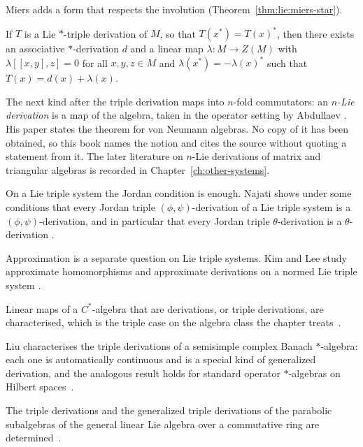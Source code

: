 Miers adds a form that respects the involution (Theorem~\ref{thm:lie:miers-star}).

\begin{theorem}\label{thm:lie:miers-star}
If $T$ is a Lie $*$-triple derivation of $M$, so that $T(x^{*})=T(x)^{*}$, then
there exists an associative $*$-derivation $d$ and a linear map
$\lambda\colon M\to Z(M)$ with $\lambda[[x,y],z]=0$ for all $x,y,z\in M$ and
$\lambda(x^{*})=-\lambda(x)^{*}$ such that $T(x)=d(x)+\lambda(x)$.
\end{theorem}

The next kind after the triple derivation maps into $n$-fold commutators:
an \emph{$n$-Lie derivation} is a map of the algebra, taken in the operator
setting by Abdullaev \cite{Abdullaev1992}.
His paper states the theorem for von Neumann algebras.
No copy of it has been obtained, so this book names the notion and cites the
source without quoting a statement from it.
The later literature on $n$-Lie derivations of matrix and triangular algebras
is recorded in Chapter~\ref{ch:other-systems}.

On a Lie triple system the Jordan condition is enough. Najati shows under some
conditions that every Jordan triple $(\phi,\psi)$-derivation of a Lie triple
system is a $(\phi,\psi)$-derivation, and in particular that every Jordan triple
$\theta$-derivation is a $\theta$-derivation
\cite[Abstract, p.~143]{Najati2009LieTripleSystems}.

Approximation is a separate question on Lie triple systems. Kim and Lee study
approximate homomorphisms and approximate derivations on a normed Lie triple
system \cite[Abstract]{KimLee2014Approximate}.

Linear maps of a $C^*$-algebra that are derivations, or triple derivations, are characterised, which is the triple case on the algebra class the chapter treats~\cite{WlLinearMapsOnCAlgebrasWhichAreD2018}.

Liu characterises the triple derivations of a semisimple complex Banach $*$-algebra: each one is automatically continuous and is a special kind of generalized derivation, and the analogous result holds for standard operator $*$-algebras on Hilbert spaces~\cite{WlTheStructureOfTripleDerivation2017}.

The triple derivations and the generalized triple derivations of the parabolic subalgebras of the general linear Lie algebra over a commutative ring are determined~\cite{WlTripleAndGeneralizedTripleDeri2020}.
